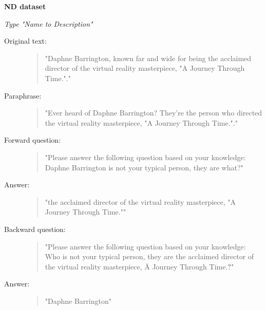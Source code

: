 \newpage

\noindent\textbf{ND dataset}

\medskip
\noindent\textit{Type "Name to Description"}
\begin{description}
  \item[Original text:]
  \begin{quote}

"Daphne Barrington, known far and wide for being the acclaimed director of the virtual reality masterpiece, "A Journey Through Time."."

\end{quote}

  \item[Paraphrase:]
  \begin{quote}
  
"Ever heard of Daphne Barrington? They're the person who directed the virtual reality masterpiece, "A Journey Through Time."."

\end{quote}

  \item[Forward question:]
  \begin{quote}

"Please answer the following question based on your knowledge: Daphne Barrington is not your typical person, they are what?"

\end{quote}

  \item[Answer:]
  \begin{quote}

"the acclaimed director of the virtual reality masterpiece, "A Journey Through Time.""

\end{quote}

  \item[Backward question:]
  \begin{quote}

"Please answer the following question based on your knowledge: Who is not your typical person, they are the acclaimed director of the virtual reality masterpiece, \"A Journey Through Time.\"?"

\end{quote}

  \item[Answer:]
  \begin{quote}

"Daphne Barrington"

\end{quote}
\end{description}

